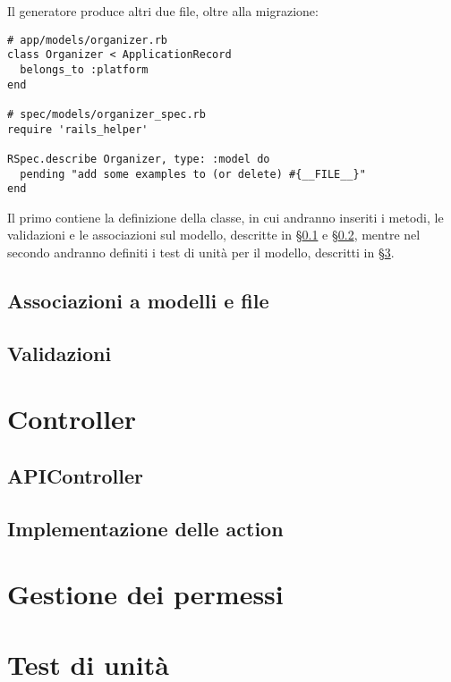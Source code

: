 Il generatore produce altri due file, oltre alla migrazione:
\begin{verbatim}
# app/models/organizer.rb
class Organizer < ApplicationRecord
  belongs_to :platform
end

# spec/models/organizer_spec.rb
require 'rails_helper'

RSpec.describe Organizer, type: :model do
  pending "add some examples to (or delete) #{__FILE__}"
end
\end{verbatim}
Il primo contiene la definizione della classe, in cui andranno inseriti i metodi, le validazioni e le associazioni sul modello, descritte in \S \ref{code:association} e \S \ref{code:validates}, mentre nel secondo andranno definiti i test di unità per il modello, descritti in \S \ref{code:spec}.

\subsection{Associazioni a modelli e file} \label{code:association}

\subsection{Validazioni} \label{code:validates}

\section{Controller}
\subsection{APIController}

\subsection{Implementazione delle action}

\section{Gestione dei permessi}

\section{Test di unità} \label{code:spec}
